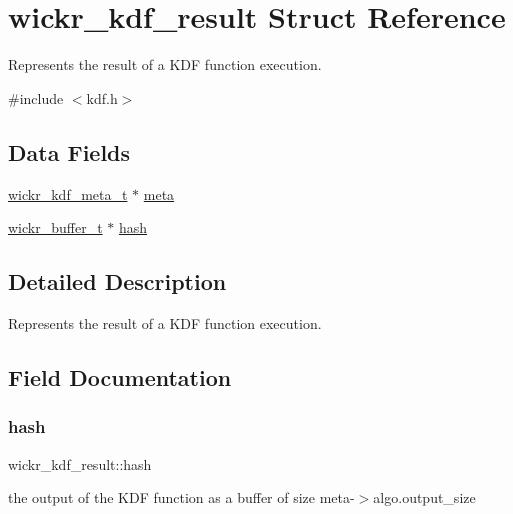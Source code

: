 \hypertarget{structwickr__kdf__result}{}\section{wickr\+\_\+kdf\+\_\+result Struct Reference}
\label{structwickr__kdf__result}


Represents the result of a K\+DF function execution.  




{\ttfamily \#include $<$kdf.\+h$>$}

\subsection*{Data Fields}
\begin{DoxyCompactItemize}
\item 
\mbox{\hyperlink{structwickr__kdf__meta}{wickr\+\_\+kdf\+\_\+meta\+\_\+t}} $\ast$ \mbox{\hyperlink{structwickr__kdf__result_a8cf0778f7cb1a157ba3f44f34cbcd92e}{meta}}
\item 
\mbox{\hyperlink{structwickr__buffer}{wickr\+\_\+buffer\+\_\+t}} $\ast$ \mbox{\hyperlink{structwickr__kdf__result_a9b637f293f3243897f9e472b6ad06c21}{hash}}
\end{DoxyCompactItemize}


\subsection{Detailed Description}
Represents the result of a K\+DF function execution. 

\subsection{Field Documentation}
\mbox{\label{structwickr__kdf__result_a9b637f293f3243897f9e472b6ad06c21}} 
\subsubsection{\texorpdfstring{hash}{hash}}
{\footnotesize\ttfamily wickr\+\_\+kdf\+\_\+result\+::hash}

the output of the K\+DF function as a buffer of size \textquotesingle{}meta-\/$>$algo.\+output\+\_\+size\textquotesingle{} \mbox{\label{structwickr__kdf__result_a8cf0778f7cb1a157ba3f44f34cbcd92e}} 
